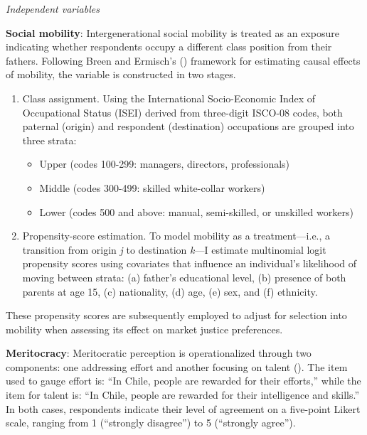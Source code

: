 \documentclass[
  12pt,
]{article}
\providecommand{\tightlist}{%
  \setlength{\itemsep}{0pt}\setlength{\parskip}{0pt}}\usepackage{longtable,booktabs,array}
\begin{document}
\emph{Independent variables}

\textbf{Social mobility}: Intergenerational social mobility is treated
as an exposure indicating whether respondents occupy a different class
position from their fathers. Following Breen and Ermisch's
() framework for estimating
causal effects of mobility, the variable is constructed in two stages.

\begin{enumerate}
\def\labelenumi{\arabic{enumi}.}
\item
  Class assignment. Using the International Socio-Economic Index of
  Occupational Status (ISEI) derived from three-digit ISCO-08 codes,
  both paternal (origin) and respondent (destination) occupations are
  grouped into three strata:

  \begin{itemize}
  \tightlist
  \item
    Upper (codes 100-299: managers, directors, professionals)
  \item
    Middle (codes 300-499: skilled white-collar workers)
  \item
    Lower (codes 500 and above: manual, semi-skilled, or unskilled
    workers)
  \end{itemize}
\item
  Propensity-score estimation. To model mobility as a treatment---i.e.,
  a transition from origin \emph{j} to destination \emph{k}---I estimate
  multinomial logit propensity scores using covariates that influence an
  individual's likelihood of moving between strata: (a) father's
  educational level, (b) presence of both parents at age 15, (c)
  nationality, (d) age, (e) sex, and (f) ethnicity.
\end{enumerate}

These propensity scores are subsequently employed to adjust for
selection into mobility when assessing its effect on market justice
preferences.

\textbf{Meritocracy}: Meritocratic perception is operationalized through
two components: one addressing effort and another focusing on talent
(). The item used to gauge
effort is: ``In Chile, people are rewarded for their efforts,'' while
the item for talent is: ``In Chile, people are rewarded for their
intelligence and skills.'' In both cases, respondents indicate their
level of agreement on a five-point Likert scale, ranging from 1
(``strongly disagree'') to 5 (``strongly agree'').
\end{document}
